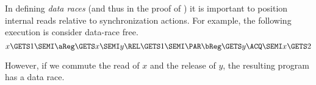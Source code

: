 In defining \emph{data races} (and thus in the proof of \drfsc) it is
important to position internal reads relative to synchronization actions.
For example, the following execution is consider data-race free.
\begin{displaymath}
  x\GETS1\SEMI
  \aReg\GETS x \SEMI
  y\REL\GETS 1 \SEMI
  \PAR
  \bReg\GETS y\ACQ \SEMI
  x\GETS 2
\end{displaymath}
\begin{tikzdisplay}[node distance=1em]
\end{tikzdisplay}
However, if we commute the read of $x$ and the release of $y$, the resulting
program has a data race.

